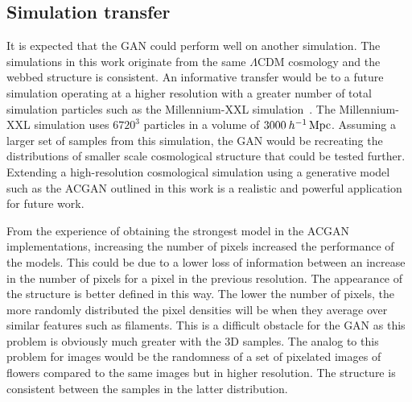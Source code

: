 \documentclass[twocolumn]{article}
\numberwithin{equation}{section}
\begin{document}


\subsection{Simulation transfer}
It is expected that the GAN could perform well on another simulation. The simulations in this work originate from the same 
$\Lambda \text{CDM}$ cosmology and the webbed structure is consistent. An informative transfer would be to a future 
simulation operating at a higher resolution with a greater number of total simulation particles such as the Millennium-XXL 
simulation~\cite{millxxlsim}. The Millennium-XXL simulation uses $6720^3$ particles in a volume of $3000 \: h^{-1} 
\,\textup{Mpc}$. Assuming a larger set of samples from this simulation, the GAN would be recreating the distributions of 
smaller scale cosmological structure that could be tested further. Extending a high-resolution cosmological simulation
using a generative model such as the ACGAN outlined in this work is a realistic and powerful application for future work.

From the experience of obtaining the strongest model in
the ACGAN implementations, increasing the number of pixels increased the performance of the models. This could be due to 
a lower loss of information between an increase in the number of pixels for a pixel in the previous resolution. The 
appearance of the structure is better defined in this way. The lower the number of pixels, the more randomly distributed 
the pixel densities will be when they average over similar features such as filaments. This is a difficult obstacle
for the GAN as this problem is obviously much greater with the 3D samples. The analog to this problem for images would be
the randomness of a set of pixelated images of flowers compared to the same images but in higher resolution. The structure
is consistent between the samples in the latter distribution. 
\end{document}
